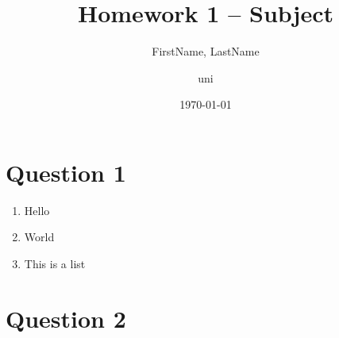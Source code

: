 \documentclass{article}
\title{Homework 1 -- Subject}
\author{FirstName, LastName \and uni}
\date{\today}
\begin{document}
  \maketitle

  \section*{Question 1}
    \begin{enumerate}
      \item Hello
      \item World
      \item This is a list
    \end{enumerate}

    \newpage
    \section*{Question 2}
\end{document}
